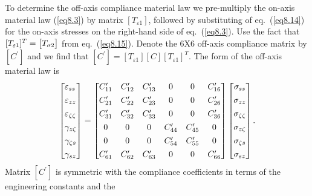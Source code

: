 \documentclass{AeroStructure-ERJohnson}
\begin{document}
To determine the off-axis compliance material law we pre-multiply
the on-axis material law (\ref{eq8.3}) by matrix $[T_{\varepsilon
1}]$, followed by substituting of eq.~(\ref{eq8.14}) for the
on-axis stresses on the right-hand side of eq.~(\ref{eq8.3}). Use
the fact that $[T_{\varepsilon 1}]^{T}=\left[\begin{array}{@{}l@{}}
T_{\sigma 2}\end{array}\right] $ from eq.~(\ref{eq8.15}). Denote
the 6X6 off-axis compliance matrix by $\left[C^{\prime}\right]$
and we find that $ \left[C^{\prime}\right]=\left[T_{\varepsilon
1}\right][C]\left[T_{\varepsilon 1}\right]^{T}$. The form of the
off-axis material law is
\begin{align}\label{eq8.16}
\left[\begin{array}{@{}l@{}} \varepsilon_{s s}\\[4pt]
\varepsilon_{z
z}\\[4pt]
\varepsilon_{\zeta \zeta}\\[4pt]
\gamma_{z \zeta}\\[4pt]
\gamma_{\zeta s}\\[4pt]
\gamma_{s z}
\end{array}\right]=\left[\begin{array}{@{}cccccc@{}}
C_{11}^{\prime} & C_{12}^{\prime} & C_{13}^{\prime} & 0 & 0 &
C_{16}^{\prime}\\[4pt]
C_{21}^{\prime} & C_{22}^{\prime} &
C_{23}^{\prime} & 0 & 0 & C_{26}^{\prime}\\[4pt]
C_{31}^{\prime} &
C_{32}^{\prime} & C_{33}^{\prime} & 0 & 0 & C_{36}^{\prime}\\[4pt]
0 &
0 & 0 & C_{44}^{\prime} & C_{45}^{\prime} & 0\\[4pt]
0 & 0 & 0 &
C_{54}^{\prime} & C_{55}^{\prime} & 0\\[4pt]
C_{61}^{\prime} &
C_{62}^{\prime} & C_{63}^{\prime} & 0 & 0 & C_{66}^{\prime}
\end{array}\right]\left[\begin{array}{@{}c@{}} \sigma_{s s}\\[4pt]
\sigma_{z z}\\[4pt]
\sigma_{\zeta \zeta}\\[4pt]
\sigma_{z \zeta}\\[4pt]
\sigma_{\zeta s}\\[4pt]
\sigma_{s z} \end{array}\right].
\end{align}
Matrix $\left[C^{\prime}\right]$ is symmetric with the compliance
coefficients in terms of the engineering constants and the
\end{document}
